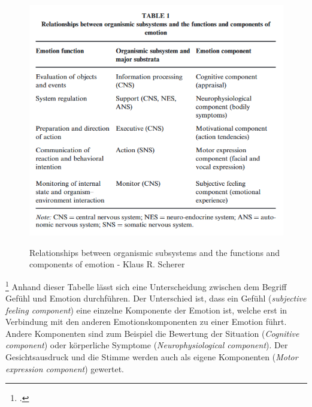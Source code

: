 \begin{figure}[h]
	\centering
	\includegraphics[width=15cm]{Bilder/Relationships-between-organismic-subsystems.png}
	\label{img:Emotion}
	\caption[Relationships between organismic subsystems and the functions and components of
	emotion - Klaus R. Scherer]{Relationships between organismic subsystems and the functions and components of
		emotion - Klaus R. Scherer\footnotemark}
\end{figure}%
\footcitetext[Vgl.][S.698 Table 1]{Kla05}
\newline
Anhand dieser Tabelle lässt sich eine Unterscheidung zwischen dem Begriff Gefühl und Emotion durchführen. Der Unterschied ist, dass ein Gefühl (\textit{subjective feeling component}) eine einzelne Komponente der Emotion ist, welche erst in Verbindung mit den anderen Emotionskomponenten zu einer Emotion führt. Andere Komponenten sind zum Beispiel die Bewertung der Situation (\textit{Cognitive component}) oder körperliche Symptome (\textit{Neurophysiological component}). Der Gesichtsausdruck und die Stimme werden auch als eigene Komponenten (\textit{Motor expression component}) gewertet. \newline \newline
\newline

